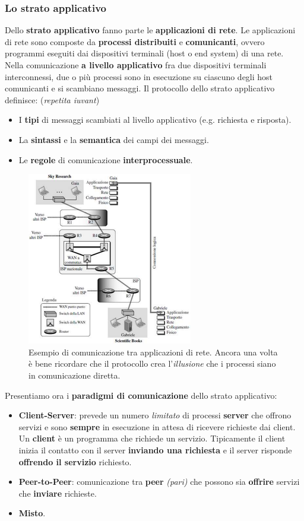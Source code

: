 \documentclass[11pt,a4paper]{article}
\theoremstyle{definition}
\begin{document}
\subsubsection{Lo strato applicativo}
Dello \textbf{strato applicativo} fanno parte le \textbf{applicazioni di rete}. Le applicazioni di rete sono composte da \textbf{processi distribuiti} e \textbf{comunicanti}, ovvero programmi eseguiti dai dispositivi terminali (host o end system) di una rete. Nella comunicazione \textbf{a livello applicativo} fra due dispositivi terminali interconnessi, due o più processi sono in esecuzione su ciascuno degli host comunicanti e si scambiano messaggi.
Il protocollo dello strato applicativo definisce: (\textit{repetita iuvant})
\begin{itemize}
	\item I \textbf{tipi} di messaggi scambiati al livello
	      applicativo (e.g. richiesta e risposta).
	\item La \textbf{sintassi} e la \textbf{semantica} dei campi dei messaggi.
	\item Le \textbf{regole} di comunicazione \textbf{interprocessuale}.
\end{itemize}
\begin{figure}[!h]
	\includegraphics[scale=0.5]{Immagini/Application_layer.png}
	\centering
	\caption{Esempio di comunicazione tra applicazioni di rete. Ancora una volta è bene ricordare che il protocollo crea l'\textit{illusione} che i processi siano in comunicazione diretta.}
\end{figure}
Presentiamo ora i \textbf{paradigmi di comunicazione} dello strato applicativo:
\begin{itemize}
	\item \textbf{Client-Server}: prevede un numero \textit{limitato} di processi \textbf{server} che
	      offrono servizi e sono \textbf{sempre} in esecuzione in attesa di ricevere richieste dai client. Un \textbf{client} è un programma che richiede un servizio. Tipicamente il client inizia il contatto con il server \textbf{inviando una richiesta} e il server risponde \textbf{offrendo il servizio} richiesto.
	\item \textbf{Peer-to-Peer}: comunicazione tra \textbf{peer} \textit{(pari)} che possono sia \textbf{offrire} servizi che \textbf{inviare} richieste.
	\item  \textbf{Misto}.
\end{itemize}
\end{document}
